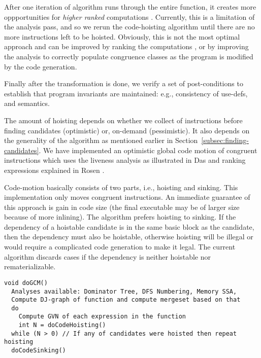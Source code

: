 \documentclass[acmlarge,review,anonymous]{acmart}\settopmatter{printfolios=true}
\begin{document}
After one iteration of algorithm runs through the entire function, it creates
more oppportunities for \emph{higher ranked} computations
\cite{rosen1988global}. Currently, this is a limitation of the \GVN{} analysis
pass, and so we rerun the code-hoisting algorithm until there are no more
instructions left to be hoisted.  Obviously, this is not the most optimal
approach and can be improved by ranking the computations \cite{rosen1988global},
or by improving the \GVN{} analysis to correctly populate congruence classes as
the program is modified by the code generation.

Finally after the transformation is done, we verify a set of post-conditions to
establish that program invariants are maintained: e.g., consistency of use-defs,
and \SSA{} semantics.

The amount of hoisting depends on whether we collect \GVN{} of instructions
before finding candidates (optimistic) or, on-demand (pessimistic). It also
depends on the generality of the \GVN{} algorithm as mentioned earlier in
Section~\ref{subsec:finding-candidates}. We have implemented an optimistic
global code motion of congruent instructions which uses the liveness analysis as
illustrated in Das \cite{das2012} and ranking expressions explained in Rosen
\cite{rosen1988global}.

Code-motion basically consists of two parts, i.e., hoisting and sinking. This
implementation only moves congruent instructions. An immediate guarantee of this
approach is gain in code size (the final executable may be of larger size
because of more inlining). The algorithm prefers hoisting to sinking. If the
dependency of a hoistable candidate is in the same basic block as the candidate,
then the dependency must also be hoistable, otherwise hoisting will be illegal or
would require a complicated code generation to make it legal. The current
algorithm discards cases if the dependency is neither hoistable nor
rematerializable.

\begin{verbatim}
void doGCM()
  Analyses available: Dominator Tree, DFS Numbering, Memory SSA,
  Compute DJ-graph of function and compute mergeset based on that
  do
    Compute GVN of each expression in the function
    int N = doCodeHoisting()
  while (N > 0) // If any of candidates were hoisted then repeat hoisting
  doCodeSinking()
\end{verbatim}
\end{document}
